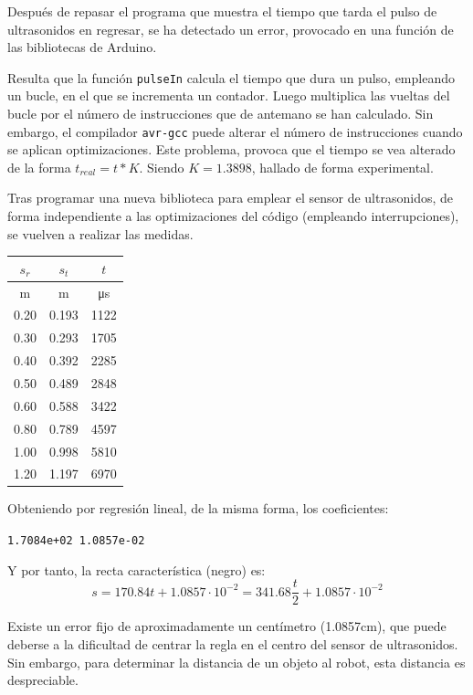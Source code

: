 \documentclass[10pt,a4paper,hidelinks,twocolumn,nobalancelastpage]{article}
\begin{document}
Después de repasar el programa que muestra el tiempo que tarda el pulso de 
ultrasonidos en regresar, se ha detectado un error, provocado en una función de 
las bibliotecas de Arduino.

Resulta que la función \texttt{pulseIn} calcula el tiempo que dura un pulso, 
empleando un bucle, en el que se incrementa un contador. Luego multiplica las 
vueltas del bucle por el número de instrucciones que de antemano se han 
calculado. Sin embargo, el compilador \texttt{avr-gcc} puede alterar el número 
de instrucciones cuando se aplican optimizaciones. Este problema, provoca que el 
tiempo se vea alterado de la forma $ t_{real} = t * K $. Siendo $ K = 
1.3898 $, hallado de forma experimental.

Tras programar una nueva biblioteca para emplear el sensor de ultrasonidos, de 
forma independiente a las optimizaciones del código (empleando interrupciones), 
se vuelven a realizar las medidas.


\begin{center}
\begin{tabular}{ | c | c | c | }
\hline
$s_{r}$ & $s_{t}$ & $t$\\ \hline
m & m & \si{\micro\second} \\ \hline \hline
0.20 & 0.193 & 1122 \\ \hline
0.30 & 0.293 & 1705 \\ \hline
0.40 & 0.392 & 2285 \\ \hline
0.50 & 0.489 & 2848 \\ \hline
0.60 & 0.588 & 3422 \\ \hline
0.80 & 0.789 & 4597 \\ \hline
1.00 & 0.998 & 5810 \\ \hline
1.20 & 1.197 & 6970 \\ \hline
\end{tabular}
\end{center}

Obteniendo por regresión lineal, de la misma forma, los coeficientes:
\begin{center}
\texttt{1.7084e+02   1.0857e-02}
\end{center}
Y por tanto, la recta característica (negro) es:
$$ s = 170.84 t + 1.0857\cdot 10^{-2} = 341.68\frac{t}{2} + 1.0857\cdot 10^{-2}
$$

Existe un error fijo de aproximadamente un centímetro (1.0857cm), que puede 
deberse a la dificultad de centrar la regla en el centro del sensor de 
ultrasonidos. Sin embargo, para determinar la distancia de un objeto al robot, 
esta distancia es despreciable.
\end{document}
